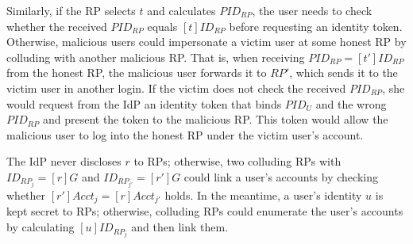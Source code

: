 
Similarly, if the RP selects $t$ and calculates $PID_{RP}$, the user needs to check whether the received $PID_{RP}$ equals $[t]ID_{RP}$ before requesting an identity token.
Otherwise, malicious users could impersonate a victim user at some honest RP by colluding with another malicious RP.
That is, when receiving $PID_{RP}=[t']ID_{RP}$ from the honest RP, the malicious user forwards it to $RP'$, which sends it to the victim user in another login.
If the victim does not check the received $PID_{RP}$, she would request from the IdP an identity token that binds $PID_U$ and the wrong $PID_{RP}$ and present the token to the malicious RP.
This token would allow the malicious user to log into the honest RP under the victim user's account.

\oldc
The IdP never discloses $r$ to RPs; otherwise, two colluding RPs with $ID_{RP_j} = [r]G$ and $ID_{RP_{j'}} = [r']G$ could link a user's accounts by checking whether $[r']Acct_j = [r]Acct_{j'}$ holds.
\newc
In the meantime, a user's identity $u$ is kept secret to RPs; otherwise, colluding RPs could enumerate the user's accounts by calculating $[u]ID_{RP_j}$ and then link them.
\oldc




